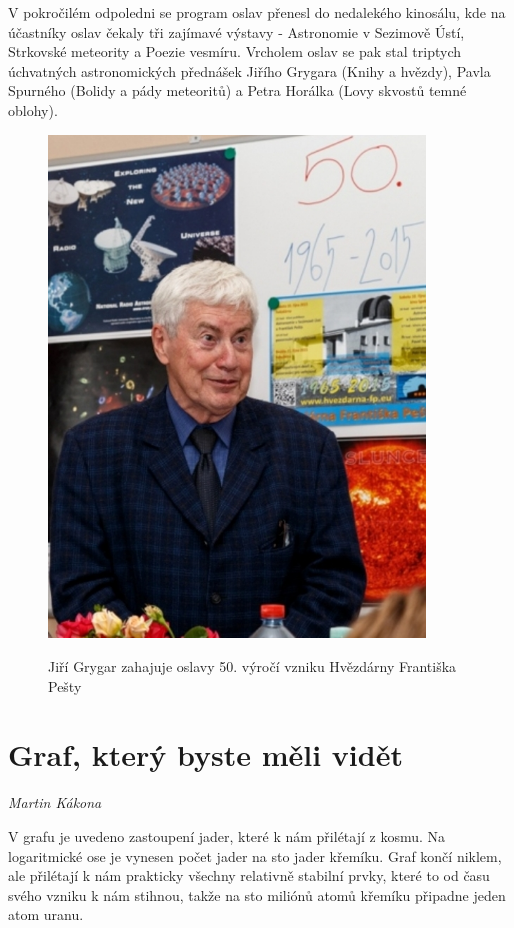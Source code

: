 \documentclass[10pt,a5paper,twoside]{book}
\newcommand{\autor}[1]{
	\begin{flushright}
	\textit{#1}
	\end{flushright}
}
\begin{document}
V pokročilém odpoledni se program oslav přenesl do nedalekého kinosálu, kde na účastníky oslav čekaly tři zajímavé výstavy - Astronomie v Sezimově Ústí, Strkovské meteority a Poezie vesmíru. Vrcholem oslav se pak stal triptych úchvatných astronomických přednášek Jiřího Grygara (Knihy a hvězdy), Pavla Spurného (Bolidy a pády meteoritů) a Petra Horálka (Lovy skvostů temné oblohy).    







\begin{figure}[!htbp]
	\begin{center}
  		\includegraphics*[width=10cm]{jg.jpg}
  	\end{center}
Jiří Grygar zahajuje oslavy 50. výročí vzniku Hvězdárny Františka Pešty
\end{figure}



\section*{Graf, který byste měli vidět}
\autor{Martin Kákona}

V grafu je uvedeno zastoupení jader, které k nám přilétají z kosmu. Na logaritmické ose je vynesen počet jader na sto jader křemíku. Graf končí niklem, ale přilétají k nám prakticky všechny relativně stabilní prvky, které to od času svého vzniku k nám stihnou, takže na sto miliónů atomů křemíku připadne jeden atom uranu.
\end{document}
